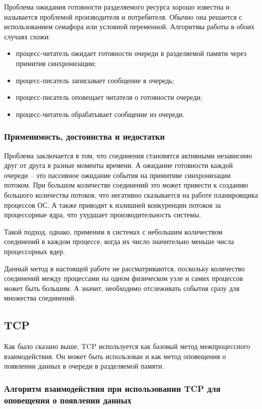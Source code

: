 Проблема ожидания готовности разделяемого ресурса хорошо известна и называется проблемой производителя и потребителя. Обычно она решается с использованием семафора или условной переменной. Алгоритмы работы в обоих случаях схожи:
\begin{itemize}
\item процесс-читатель ожидает готовности очереди в разделяемой памяти через примитив синхронизации;
\item процесс-писатель записывает сообщение в очередь;
\item процесс-писатель оповещает читателя о готовности очереди;
\item процесс-читатель обрабатывает сообщение из очереди.
\end{itemize}

\subsubsection{Применимость, достоинства и недостатки}

Проблема заключается в том, что соединения становятся активными независимо друг от друга в разные моменты времени. А ожидание готовности каждой очереди -- это пассивное ожидание события на примитиве синхронизации потоком. При большом количестве соединений это может привести к созданию большого количества потоков, что негативно сказывается на работе планировщика процессов ОС. А также приводит к излишней конкуренции потоков за процессорные ядра, что ухудшает производительность системы.

Такой подход, однако, применим в системах с небольшим количеством соединений в каждом процессе, когда их число значительно меньше числа процессорных ядер.

Данный метод в настоящей работе не рассматриваются, поскольку количество соединений между процессами на одном физическом узле и самих процессов может быть большим. А значит, необходимо отслеживать события сразу для множества соединений.

\subsection{TCP}\label{chapter31:SignalTCP}

Как было сказано выше, TCP используется как базовый метод межпроцессного взаимодействия. Он может быть использован и как метод оповещения о появлении данных в очереди в разделяемой памяти.

\subsubsection{Алгоритм взаимодействия при использовании TCP для оповещения о появлении данных}

